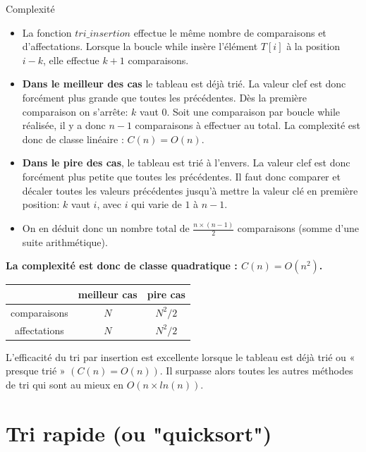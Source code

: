 \begin{prop}{Complexité}
\begin{itemize}
\item La fonction $tri\_insertion$ effectue le même nombre de comparaisons et d'affectations. Lorsque la boucle while insère l'élément $T[i]$ à la position $i-k$, elle effectue $k+1$ comparaisons. 


\item \textbf{Dans le meilleur des cas} le tableau est déjà trié. 
La valeur clef est donc forcément plus grande que toutes les précédentes. Dès la première comparaison on s'arrête: 
$k$ vaut $0$.
Soit une comparaison par boucle while réalisée, il y a donc $n-1$ comparaisons à effectuer au total. La complexité est donc de classe linéaire : $C(n)=O(n)$.

\item \textbf{Dans le pire des cas}, le tableau est trié à l'envers. La valeur clef est donc forcément plus petite que toutes les précédentes.
Il faut donc comparer et décaler toutes les valeurs précédentes jusqu'à mettre la valeur clé en première position:  $k$ vaut $i$, avec $i$ qui varie de $1$ à
$n-1$.
\item On en déduit donc un nombre total de $\frac{n\times(n-1)}{2}$ comparaisons (somme d'une suite arithmétique).
\end{itemize}
\textbf{La complexité est donc de classe quadratique : $C(n)=O(n^2)$.}


\begin{center}
\begin{tabular}{|c|c|c|}
\hline 
\rule[-1ex]{0pt}{2.5ex}  & meilleur cas &  pire cas \\ 
\hline 
\rule[-1ex]{0pt}{2.5ex} comparaisons & $N$ & $N^2/2$ \\ 
\hline 
\rule[-1ex]{0pt}{2.5ex} affectations & $N$ & $N^2/2$ \\ 
\hline 
\end{tabular} 
\end{center}



L'efficacité du tri par insertion est excellente lorsque le tableau est déjà trié ou « presque trié » $(C(n)=O(n))$. Il surpasse alors toutes les autres méthodes de tri qui sont au mieux en $O(n \times ln(n))$.
\end{prop}

\section{Tri rapide (ou "quicksort")}

